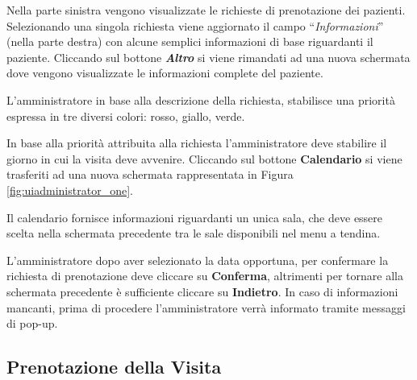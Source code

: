 Nella parte sinistra vengono visualizzate le richieste di prenotazione
dei pazienti. Selezionando una singola richiesta viene aggiornato
il campo {}``\emph{Informazioni}'' (nella parte destra) con alcune
semplici informazioni di base riguardanti il paziente. Cliccando sul
bottone \textbf{\emph{Altro}} si viene rimandati ad una nuova schermata
dove vengono visualizzate le informazioni complete del paziente.

L'amministratore in base alla descrizione della richiesta, stabilisce
una priorità espressa in tre diversi colori: rosso, giallo, verde.

In base alla priorità attribuita alla richiesta l'amministratore deve
stabilire il giorno in cui la visita deve avvenire. Cliccando sul
bottone \textbf{Calendario} si viene trasferiti ad una nuova schermata
rappresentata in Figura \vref{fig:uiadministrator_one}.

Il calendario fornisce informazioni riguardanti un unica sala, che
deve essere scelta nella schermata precedente tra le sale disponibili
nel menu a tendina.

L'amministratore dopo aver selezionato la data opportuna, per confermare
la richiesta di prenotazione deve cliccare su \textbf{Conferma}, altrimenti
per tornare alla schermata precedente è sufficiente cliccare su \textbf{Indietro}.
In caso di informazioni mancanti, prima di procedere l'amministratore
verrà informato tramite messaggi di pop-up.


\subsection{Prenotazione della Visita}

